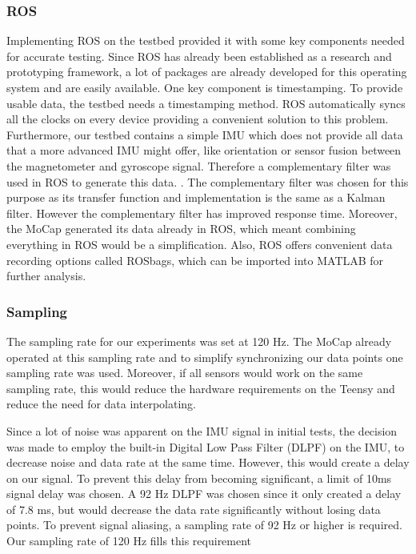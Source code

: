 \subsubsection{ROS}
Implementing ROS on the testbed provided it with some key components needed for accurate testing. Since ROS has already been established as a research and prototyping framework, a lot of packages are already developed for this operating system and are easily available.  One key component is timestamping. To provide usable data, the testbed needs a timestamping method. ROS automatically syncs all the clocks on every device providing a convenient solution to this problem. Furthermore, our testbed contains a simple IMU which does not provide all data that a more advanced IMU might offer, like orientation or sensor fusion between the magnetometer and gyroscope signal. Therefore a complementary filter was used in ROS to generate this data. \cite{IMUfilter}. The complementary filter was chosen for this purpose as its transfer function and implementation is the same as a Kalman filter. However the complementary filter has improved response time. Moreover, the MoCap generated its data already in ROS, which meant combining everything in ROS would be a simplification. Also, ROS offers convenient data recording options called ROSbags, which can be imported into MATLAB for further analysis.

\subsubsection{Sampling}
The sampling rate for our experiments was set at 120 Hz. The MoCap already operated at this sampling rate and to simplify synchronizing our data points one sampling rate was used. Moreover, if all sensors would work on the same sampling rate, this would reduce the hardware requirements on the Teensy and reduce the need for data interpolating. 

Since a lot of noise was apparent on the IMU signal in initial tests, the decision was made to employ the built-in Digital Low Pass Filter (DLPF) on the IMU, to decrease noise and data rate at the same time. However, this would create a delay on our signal. To prevent this delay from becoming significant, a limit of 10ms signal delay was chosen. A 92 Hz DLPF was chosen since it only created a delay of 7.8 ms, but would decrease the data rate significantly without losing data points. To prevent signal aliasing, a sampling rate of 92 Hz or higher is required. Our sampling rate of 120 Hz fills this requirement

